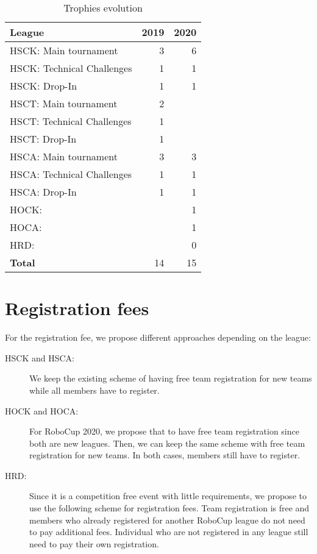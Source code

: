\documentclass{article}
\begin{document}
\begin{table}[h]
  \centering
  \caption{\label{tab:trophies}Trophies evolution}
  \begin{tabular}{l | r | r}
    League & 2019 & 2020\\
    \hline
    HSCK: Main tournament & 3 & 6\\ 
    HSCK: Technical Challenges & 1 & 1\\
    HSCK: Drop-In & 1 & 1\\
    HSCT: Main tournament & 2 & \\ 
    HSCT: Technical Challenges & 1 & \\
    HSCT: Drop-In & 1 & \\
    HSCA: Main tournament & 3 & 3\\ 
    HSCA: Technical Challenges & 1 & 1\\
    HSCA: Drop-In & 1 & 1\\
    HOCK: &  & 1\\
    HOCA: &  & 1\\ 
    HRD: &  & 0\\
    \hline
    \textbf{Total} & 14 & 15
  \end{tabular}
\end{table}



\section{Registration fees}

For the registration fee, we propose different approaches depending on the
league:

\begin{description}
\item[HSCK and HSCA:] We keep the existing scheme of having free team
  registration for new teams while all members have to register.
\item[HOCK and HOCA:] For RoboCup 2020, we propose that to have free team
  registration since both are new leagues.
  Then, we can keep the same scheme with free team registration for new teams.
  In both cases, members still have to register.
\item[HRD:] Since it is a competition free event with little requirements,
  we propose to use the following scheme for registration fees.
  Team registration is free and members who already registered for another
  RoboCup league do not need to pay additional fees.
  Individual who are not registered in any league still need to pay their own
  registration.
\end{description}
\end{document}
